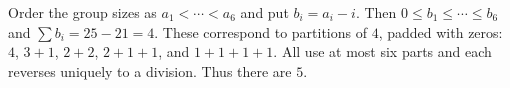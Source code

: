 Order the group sizes as $a_1<\cdots<a_6$ and put $b_i=a_i-i$. Then $0\le b_1\le\cdots\le b_6$ and $\sum b_i=25-21=4$. These correspond to partitions of $4$, padded with zeros: $4$, $3+1$, $2+2$, $2+1+1$, and $1+1+1+1$. All use at most six parts and each reverses uniquely to a division. Thus there are $\boxed5$.

